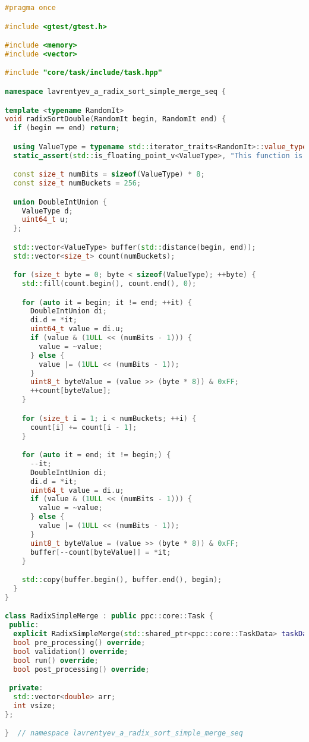 \documentclass[12pt]{article}
\begin{document}
\begin{lstlisting}[language=C++]
#pragma once

#include <gtest/gtest.h>

#include <memory>
#include <vector>

#include "core/task/include/task.hpp"

namespace lavrentyev_a_radix_sort_simple_merge_seq {

template <typename RandomIt>
void radixSortDouble(RandomIt begin, RandomIt end) {
  if (begin == end) return;

  using ValueType = typename std::iterator_traits<RandomIt>::value_type;
  static_assert(std::is_floating_point_v<ValueType>, "This function is designed for floating-point types.");

  const size_t numBits = sizeof(ValueType) * 8;
  const size_t numBuckets = 256;

  union DoubleIntUnion {
    ValueType d;
    uint64_t u;
  };

  std::vector<ValueType> buffer(std::distance(begin, end));
  std::vector<size_t> count(numBuckets);

  for (size_t byte = 0; byte < sizeof(ValueType); ++byte) {
    std::fill(count.begin(), count.end(), 0);

    for (auto it = begin; it != end; ++it) {
      DoubleIntUnion di;
      di.d = *it;
      uint64_t value = di.u;
      if (value & (1ULL << (numBits - 1))) {
        value = ~value;
      } else {
        value |= (1ULL << (numBits - 1));
      }
      uint8_t byteValue = (value >> (byte * 8)) & 0xFF;
      ++count[byteValue];
    }

    for (size_t i = 1; i < numBuckets; ++i) {
      count[i] += count[i - 1];
    }

    for (auto it = end; it != begin;) {
      --it;
      DoubleIntUnion di;
      di.d = *it;
      uint64_t value = di.u;
      if (value & (1ULL << (numBits - 1))) {
        value = ~value;
      } else {
        value |= (1ULL << (numBits - 1));
      }
      uint8_t byteValue = (value >> (byte * 8)) & 0xFF;
      buffer[--count[byteValue]] = *it;
    }

    std::copy(buffer.begin(), buffer.end(), begin);
  }
}

class RadixSimpleMerge : public ppc::core::Task {
 public:
  explicit RadixSimpleMerge(std::shared_ptr<ppc::core::TaskData> taskData_) : Task(std::move(taskData_)) {}
  bool pre_processing() override;
  bool validation() override;
  bool run() override;
  bool post_processing() override;

 private:
  std::vector<double> arr;
  int vsize;
};

}  // namespace lavrentyev_a_radix_sort_simple_merge_seq
\end{lstlisting}
\end{document}

